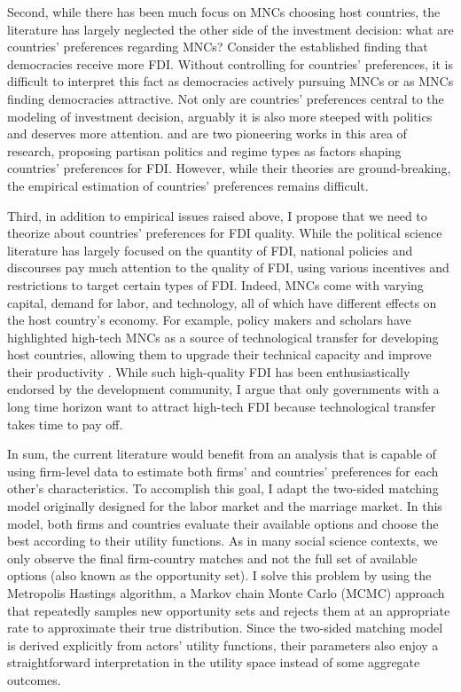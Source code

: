 Second, while there has been much focus on MNCs choosing host countries, the
literature has largely neglected the other side of the investment decision: what
are countries' preferences regarding MNCs? Consider the established finding that
democracies receive more FDI. Without controlling for countries' preferences, it
is difficult to interpret this fact as democracies actively pursuing MNCs or as
MNCs finding democracies attractive. Not only are countries' preferences central
to the modeling of investment decision, arguably it is also more steeped with
politics and deserves more attention. \citet{Pinto2013} and \citet{Pandya2016}
are two pioneering works in this area of research, proposing partisan politics
and regime types as factors shaping countries' preferences for FDI. However,
while their theories are ground-breaking, the empirical estimation of countries'
preferences remains difficult.

Third, in addition to empirical issues raised above, I propose that we need to
theorize about countries' preferences for FDI quality. While the political
science literature has largely focused on the quantity of FDI, national policies
and discourses pay much attention to the quality of FDI, using various
incentives and restrictions to target certain types of FDI. Indeed, MNCs come
with varying capital, demand for labor, and technology, all of which have
different effects on the host country's economy. For example, policy makers and
scholars have highlighted high-tech MNCs as a source of technological transfer
for developing host countries, allowing them to upgrade their technical capacity
and improve their productivity \citep{Findlay1978, Nunnenkamp2004}. While such
high-quality FDI has been enthusiastically endorsed by the development
community, I argue that only governments with a long time horizon want to
attract high-tech FDI because technological transfer takes time to pay off.

In sum, the current literature would benefit from an analysis that is capable of
using firm-level data to estimate both firms' and countries' preferences for
each other's characteristics. To accomplish this goal, I adapt the two-sided
matching model originally designed for the labor market and the marriage market.
In this model, both firms and countries evaluate their available options and
choose the best according to their utility functions. As in many social science
contexts, we only observe the final firm-country matches and not the full set of
available options (also known as the opportunity set). I solve this problem by
using the Metropolis Hastings algorithm, a Markov chain Monte Carlo (MCMC)
approach that repeatedly samples new opportunity sets and rejects them at an
appropriate rate to approximate their true distribution. Since the two-sided
matching model is derived explicitly from actors' utility functions, their
parameters also enjoy a straightforward interpretation in the utility space
instead of some aggregate outcomes.

